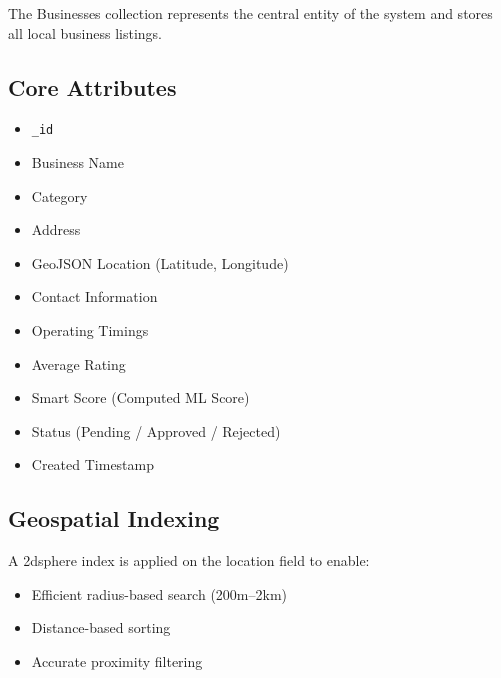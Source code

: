 \documentclass[12pt,a4paper]{report}
\begin{document}
The Businesses collection represents the central entity of the system and stores all local business listings.

\subsection*{Core Attributes}

\begin{itemize}

\item \texttt{\_id}

\item Business Name

\item Category

\item Address

\item GeoJSON Location (Latitude, Longitude)

\item Contact Information

\item Operating Timings

\item Average Rating

\item Smart Score (Computed ML Score)

\item Status (Pending / Approved / Rejected)

\item Created Timestamp

\end{itemize}

\subsection*{Geospatial Indexing}

A 2dsphere index is applied on the location field to enable:

\begin{itemize}

\item Efficient radius-based search (200m--2km)

\item Distance-based sorting

\item Accurate proximity filtering

\end{itemize}
\end{document}
